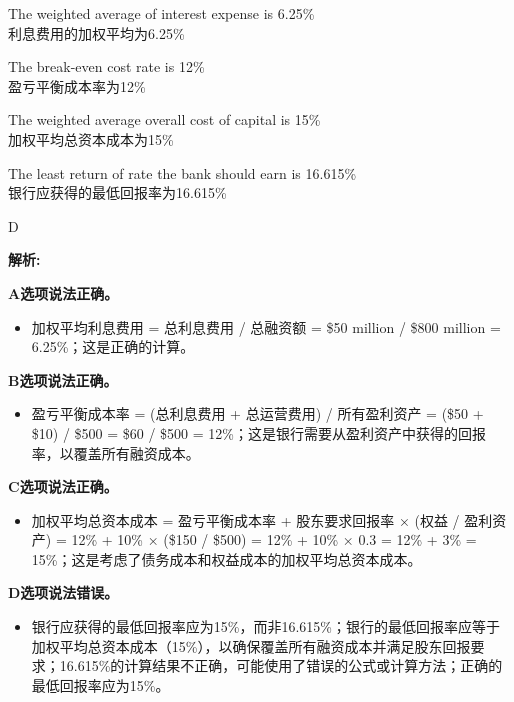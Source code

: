 \documentclass{article}
\newenvironment{explanation}
{\textbf{解析:}\par}
{\par}
\begin{document}
\begin{choices}
    \item The weighted average of interest expense is 6.25\%\\
    利息费用的加权平均为6.25\%
    \item The break-even cost rate is 12\%\\
    盈亏平衡成本率为12\%
    \item The weighted average overall cost of capital is 15\%\\
    加权平均总资本成本为15\%
    \item The least return of rate the bank should earn is 16.615\%\\
    银行应获得的最低回报率为16.615\%
\end{choices}

\begin{correctanswer}
    D
\end{correctanswer}

\begin{explanation}
    \textbf{A选项说法正确。}
    \begin{itemize}
        \item 加权平均利息费用 = 总利息费用 / 总融资额 = \$50 million / \$800 million = 6.25\%；这是正确的计算。
    \end{itemize}

    \textbf{B选项说法正确。}
    \begin{itemize}
        \item 盈亏平衡成本率 = (总利息费用 + 总运营费用) / 所有盈利资产 = (\$50 + \$10) / \$500 = \$60 / \$500 = 12\%；这是银行需要从盈利资产中获得的回报率，以覆盖所有融资成本。
    \end{itemize}

    \textbf{C选项说法正确。}
    \begin{itemize}
        \item 加权平均总资本成本 = 盈亏平衡成本率 + 股东要求回报率 × (权益 / 盈利资产) = 12\% + 10\% × (\$150 / \$500) = 12\% + 10\% × 0.3 = 12\% + 3\% = 15\%；这是考虑了债务成本和权益成本的加权平均总资本成本。
    \end{itemize}

    \textbf{D选项说法错误。}
    \begin{itemize}
        \item 银行应获得的最低回报率应为15\%，而非16.615\%；银行的最低回报率应等于加权平均总资本成本（15\%），以确保覆盖所有融资成本并满足股东回报要求；16.615\%的计算结果不正确，可能使用了错误的公式或计算方法；正确的最低回报率应为15\%。
    \end{itemize}
\end{explanation}
\end{document}
